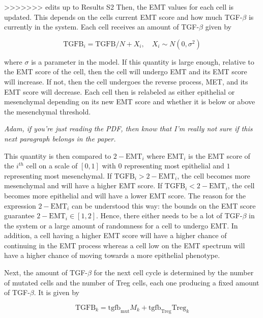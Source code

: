 \documentclass{article}
\begin{document}
>>>>>>> edits up to Results S2
Then, the EMT values for each cell is updated.
This depends on the cells current EMT score and how much TGF-$\beta$ is currently in the system.
Each cell receives an amount of TGF-$\beta$ given by

$$ \text{TGFB}_i = \text{TGFB}/N + X_i, \quad X_i \sim N(0,\sigma^2)$$

where $\sigma$ is a parameter in the model.
If this quantity is large enough, relative to the EMT score of the cell, then the cell will undergo EMT and its EMT score will increase.
If not, then the cell undergoes the reverse process, MET, and its EMT score will decrease.
Each cell then is relabeled as either epithelial or mesenchymal depending on its new EMT score and whether it is below or above the mesenchymal threshold.




\emph{Adam, if you're just reading the PDF, then know that I'm really not sure if this next paragraph belongs in the paper.}

This quantity is then compared to $2-\text{EMT}_i$ where $\text{EMT}_i$ is the EMT score of the $i^{th}$ cell on a scale of $[0,1]$ with $0$ representing most epithelial and $1$ representing most mesenchymal.
If $\text{TGFB}_i>2-\text{EMT}_i$, the cell becomes more mesenchymal and will have a higher EMT score.
If $\text{TGFB}_i<2-\text{EMT}_i$, the cell becomes more epithelial and will have a lower EMT score.
The reason for the expression $2-\text{EMT}_i$ can be understood this way: 
the bounds on the EMT score guarantee $2-\text{EMT}_i\in[1,2]$.
Hence, there either needs to be a lot of TGF-$\beta$ in the system or a large amount of randomness for a cell to undergo EMT.
In addition, a cell having a higher EMT score will have a higher chance of continuing in the EMT process whereas a cell low on the EMT spectrum will have a higher chance of moving towards a more epithelial phenotype.




Next, the amount of TGF-$\beta$ for the next cell cycle is determined by the number of mutated cells and the number of Treg cells, each one producing a fixed amount of TGF-$\beta$. It is given by

$$ \text{TGFB}_k = \text{tgfb}_{\text{mut}}M_k + \text{tgfb}_{\text{Treg}}\text{Treg}_k$$ %
\end{document}
